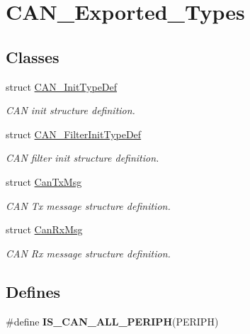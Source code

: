 \hypertarget{group__CAN__Exported__Types}{
\section{CAN\_\-Exported\_\-Types}
\label{group__CAN__Exported__Types}
}
\subsection*{Classes}
\begin{DoxyCompactItemize}
\item 
struct \hyperlink{structCAN__InitTypeDef}{CAN\_\-InitTypeDef}
\begin{DoxyCompactList}\small\item\em CAN init structure definition. \item\end{DoxyCompactList}\item 
struct \hyperlink{structCAN__FilterInitTypeDef}{CAN\_\-FilterInitTypeDef}
\begin{DoxyCompactList}\small\item\em CAN filter init structure definition. \item\end{DoxyCompactList}\item 
struct \hyperlink{structCanTxMsg}{CanTxMsg}
\begin{DoxyCompactList}\small\item\em CAN Tx message structure definition. \item\end{DoxyCompactList}\item 
struct \hyperlink{structCanRxMsg}{CanRxMsg}
\begin{DoxyCompactList}\small\item\em CAN Rx message structure definition. \item\end{DoxyCompactList}\end{DoxyCompactItemize}
\subsection*{Defines}
\begin{DoxyCompactItemize}
\item 
\#define {\bfseries IS\_\-CAN\_\-ALL\_\-PERIPH}(PERIPH)
\end{DoxyCompactItemize}


